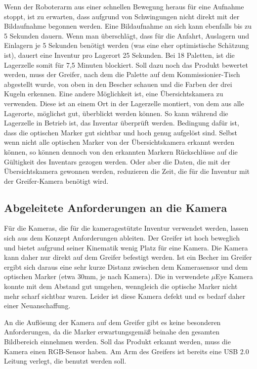 Wenn der Roboterarm aus einer schnellen Bewegung heraus für eine Aufnahme stoppt, ist zu erwarten, dass aufgrund von Schwingungen nicht direkt mit der Bildaufnahme begonnen werden.
Eine Bildaufnahme an sich kann ebenfalls bis zu 5 Sekunden dauern. 
Wenn man überschlägt, dass für die Anfahrt, Auslagern und Einlagern je 5 Sekunden benötigt werden (was eine eher optimistische Schätzung ist), dauert eine Inventur pro Lagerort 25 Sekunden.
Bei 18 Paletten, ist die Lagerzelle somit für 7,5 Minuten blockiert.
Soll dazu noch das Produkt bewertet werden, muss der Greifer, nach dem die Palette auf dem Kommissionier-Tisch abgestellt wurde, von oben in den Bescher schauen und die Farben der drei 
Kugeln erkennen.
Eine andere Möglichkeit ist, eine Übersichtskamera zu verwenden. 
Diese ist an einem Ort in der Lagerzelle montiert, von dem aus alle Lagerorte, möglichst gut, überblickt werden können.
So kann während die Lagerzelle in Betrieb ist, das Inventar überprüft werden.
Bedingung dafür ist, dass die optischen Marker gut sichtbar und hoch genug aufgelöst sind.
Selbst wenn nicht alle optischen Marker von der Übersichtskamera erkannt werden können, so können dennoch von den erkannten Markern Rückschlüsse auf die Gültigkeit des Inventars gezogen werden. 
Oder aber die Daten, die mit der Übersichtskamera gewonnen werden, reduzieren die Zeit, die für die Inventur mit der Greifer-Kamera benötigt wird.


\subsection {Abgeleitete Anforderungen an die Kamera}

Für die Kameras, die für die kameragestützte Inventur verwendet werden, lassen sich aus dem Konzept Anforderungen ableiten. 
Der Greifer ist hoch beweglich und bietet aufgrund seiner Kinematik wenig Platz für eine Kamera. 
Die Kamera kann daher nur direkt auf dem Greifer befestigt werden. 
Ist ein Becher im Greifer ergibt sich daraus eine sehr kurze Distanz zwischen dem Kamerasensor und dem optischen Marker (etwa 30mm, je nach Kamera).
Die in \cite[Sebastian Hüblers Arbeit]{Hübler2019} verwendete $\mu$Eye Kamera konnte mit dem Abstand gut umgehen, wenngleich die optische Marker nicht mehr scharf sichtbar waren.
Leider ist diese Kamera defekt und es bedarf daher einer Neuanschaffung. 

An die Auflösung der Kamera auf dem Greifer gibt es keine besonderen Anforderungen, da die Marker erwartungsgemäß beinahe den gesamten Bildbereich einnehmen werden. 
Soll das Produkt erkannt werden, muss die Kamera einen RGB-Sensor haben.
Am Arm des Greifers ist bereits eine USB 2.0 Leitung verlegt, die benutzt werden soll. 

